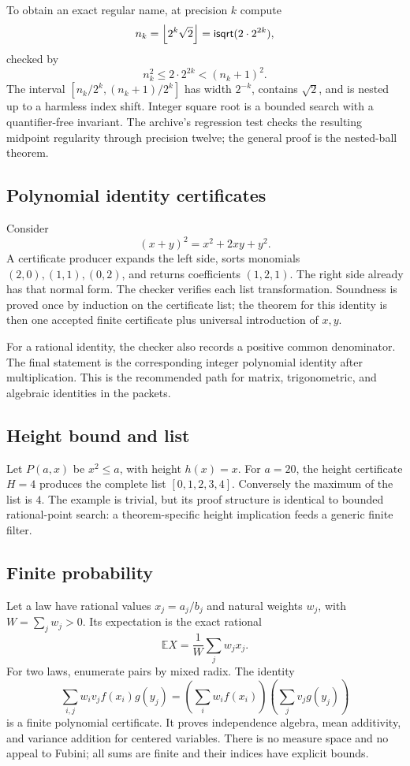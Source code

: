 To obtain an exact regular name, at precision \(k\) compute
\[
 n_k=\left\lfloor2^{k}\sqrt2\right\rfloor
     =\mathsf{isqrt}(2\cdot2^{2k}),
\]
checked by
\[
 n_k^2\le2\cdot2^{2k}<(n_k+1)^2.
\]
The interval
\([n_k/2^k,(n_k+1)/2^k]\) has width \(2^{-k}\), contains \(\sqrt2\), and is
nested up to a harmless index shift.  Integer square root is a bounded search
with a quantifier-free invariant.  The archive's regression test checks the
resulting midpoint regularity through precision twelve; the general proof is
the nested-ball theorem.

\subsection{Polynomial identity certificates}

Consider
\[
 (x+y)^2=x^2+2xy+y^2.
\]
A certificate producer expands the left side, sorts monomials
\((2,0),(1,1),(0,2)\), and returns coefficients \((1,2,1)\).  The right side
already has that normal form.  The checker verifies each list transformation.
Soundness is proved once by induction on the certificate list; the theorem for
this identity is then one accepted finite certificate plus universal
introduction of \(x,y\).

For a rational identity, the checker also records a positive common
denominator.  The final statement is the corresponding integer polynomial
identity after multiplication.  This is the recommended path for matrix,
trigonometric, and algebraic identities in the packets.

\subsection{Height bound and list}

Let \(P(a,x)\) be \(x^2\le a\), with height \(h(x)=x\).  For \(a=20\), the
height certificate \(H=4\) produces the complete list
\([0,1,2,3,4]\).  Conversely the maximum of the list is \(4\).  The example is
trivial, but its proof structure is identical to bounded rational-point search:
a theorem-specific height implication feeds a generic finite filter.

\subsection{Finite probability}

Let a law have rational values \(x_j=a_j/b_j\) and natural weights \(w_j\),
with \(W=\sum_jw_j>0\).  Its expectation is the exact rational
\[
 \mathbb E X=\frac{1}{W}\sum_jw_jx_j.
\]
For two laws, enumerate pairs by mixed radix.  The identity
\[
 \sum_{i,j}w_i v_j f(x_i)g(y_j)
 =\left(\sum_iw_i f(x_i)\right)
  \left(\sum_jv_j g(y_j)\right)
\]
is a finite polynomial certificate.  It proves independence algebra, mean
additivity, and variance addition for centered variables.  There is no measure
space and no appeal to Fubini; all sums are finite and their indices have
explicit bounds.

